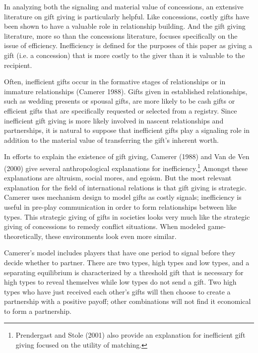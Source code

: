\documentclass[12pt, letterpaper]{article}
\begin{document}
In analyzing both the signaling and material value of concessions, an extensive literature on gift giving is particularly helpful. Like concessions, costly gifts have been shown to have a valuable role in relationship building. And the gift giving literature, more so than the concessions literature, focuses specifically on the issue of efficiency. Inefficiency is defined for the purposes of this paper as giving a gift (i.e. a concession) that is more costly to the giver than it is valuable to the recipient. 

Often, inefficient gifts occur in the formative stages of relationships or in immature relationships (Camerer 1988). Gifts given in established relationships, such as wedding presents or spousal gifts, are more likely to be cash gifts or efficient gifts that are specifically requested or selected from a registry. Since inefficient gift giving is more likely involved in nascent relationships and partnerships, it is natural to suppose that inefficient gifts play a signaling role in addition to the material value of transferring the gift's inherent worth. 

In efforts to explain the existence of gift giving,  Camerer (1988) and Van de Ven (2000) give several anthropological explanations for inefficiency.\footnote{Prendergast and Stole (2001) also provide an explanation for inefficient gift giving focused on the utility of matching.} Amongst these explanations are altruism, social mores, and egoism. But the most relevant explanation for the field of international relations is that gift giving is strategic. Camerer uses mechanism design to model gifts as costly signals; inefficiency is useful in pre-play communication in order to form relationships between like types. This strategic giving of gifts in societies looks very much like the strategic giving of concessions to remedy conflict situations. When modeled game-theoretically, these environments look even more similar.

Camerer's model includes players that have one period to signal before they decide whether to partner. There are two types, high types and low types, and a separating equilibrium is characterized by a threshold gift that is necessary for high types to reveal themselves while low types do not send a gift. Two high types who have just received each other's gifts will then choose to create a partnership with a positive payoff; other combinations will not find it economical to form a partnership.
\end{document}
